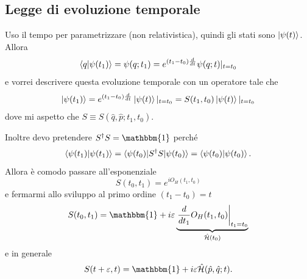 \subsection{Legge di evoluzione temporale}
Uso il tempo per parametrizzare (non relativistica), quindi gli stati sono \( \ket{\psi(t)} \). Allora
\[
\braket{q|\psi(t_1)} = \psi(q; t_1) = e^{(t_1 - t_0) \frac{d}{dt}} \psi(q; t)|_{t = t_0}
\]
e vorrei descrivere questa evoluzione temporale con un operatore tale che
\[
\ket{\psi(t_1)} = e^{(t_1 - t_0) \frac{d}{dt}} \ket{\psi(t)}|_{t = t_0} = S(t_1, t_0) \ket{\psi(t)}|_{t = t_0}
\]
dove mi aspetto che \( S \equiv S(\hat{q}, \hat{p}; t_1, t_0) \).

\bigskip
\noindent
Inoltre devo pretendere \( S^\dag S = \mathbbm{1} \) perché
\[
\braket{\psi(t_1)|\psi(t_1)} = \braket{\psi(t_0)|S^\dag S|\psi(t_0)} = \braket{\psi(t_0)|\psi(t_0)}.
\]
Allora è comodo passare all'esponenziale
\[
S(t_0, t_1) = e^{i O_H(t_1, t_0)}
\]
e fermarmi allo sviluppo al primo ordine \( (t_1 - t_0) = t \)
\[
S(t_0, t_1) = \mathbbm{1} + i \varepsilon \underbrace{\left. \frac{d}{dt_1} O_H(t_1, t_0)\right|_{t_1 = t_0}}_{\hat{\mathcal{H}}(t_0)}
\]
e in generale
\[
S(t + \varepsilon, t) = \mathbbm{1} + i \varepsilon \hat{\mathcal{H}}(\hat{p}, \hat{q}; t).
\]